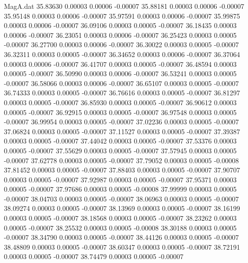 \begin{filecontents}{MagA.dat}
  35.83630    0.00003    0.00006   -0.00007
  35.88181    0.00003    0.00006   -0.00007
  35.95148    0.00003    0.00006   -0.00007
  35.97591    0.00003    0.00006   -0.00007
  35.99875    0.00003    0.00006   -0.00007
  36.09106    0.00003    0.00005   -0.00007
  36.18435    0.00003    0.00006   -0.00007
  36.23051    0.00003    0.00006   -0.00007
  36.25423    0.00003    0.00005   -0.00007
  36.27700    0.00003    0.00006   -0.00007
  36.30022    0.00003    0.00005   -0.00007
  36.32311    0.00003    0.00005   -0.00007
  36.34652    0.00003    0.00006   -0.00007
  36.37064    0.00003    0.00006   -0.00007
  36.41707    0.00003    0.00005   -0.00007
  36.48594    0.00003    0.00005   -0.00007
  36.50990    0.00003    0.00006   -0.00007
  36.53241    0.00003    0.00005   -0.00007
  36.58066    0.00003    0.00006   -0.00007
  36.65107    0.00003    0.00005   -0.00007
  36.74333    0.00003    0.00005   -0.00007
  36.76616    0.00003    0.00005   -0.00007
  36.81297    0.00003    0.00005   -0.00007
  36.85930    0.00003    0.00005   -0.00007
  36.90612    0.00003    0.00005   -0.00007
  36.92915    0.00003    0.00005   -0.00007
  36.97548    0.00003    0.00005   -0.00007
  36.99954    0.00003    0.00005   -0.00007
  37.02236    0.00003    0.00005   -0.00007
  37.06824    0.00003    0.00005   -0.00007
  37.11527    0.00003    0.00005   -0.00007
  37.39387    0.00003    0.00005   -0.00007
  37.44042    0.00003    0.00005   -0.00007
  37.53376    0.00003    0.00005   -0.00007
  37.55629    0.00003    0.00005   -0.00007
  37.57945    0.00003    0.00005   -0.00007
  37.62778    0.00003    0.00005   -0.00007
  37.79052    0.00003    0.00005   -0.00008
  37.81452    0.00003    0.00005   -0.00007
  37.88403    0.00003    0.00005   -0.00007
  37.90707    0.00003    0.00005   -0.00007
  37.92987    0.00003    0.00005   -0.00007
  37.95371    0.00003    0.00005   -0.00007
  37.97686    0.00003    0.00005   -0.00008
  37.99999    0.00003    0.00005   -0.00007
  38.04703    0.00003    0.00005   -0.00007
  38.06963    0.00003    0.00005   -0.00007
  38.09274    0.00003    0.00005   -0.00007
  38.13969    0.00003    0.00005   -0.00007
  38.16199    0.00003    0.00005   -0.00007
  38.18568    0.00003    0.00005   -0.00007
  38.23262    0.00003    0.00005   -0.00007
  38.25532    0.00003    0.00005   -0.00008
  38.30188    0.00003    0.00005   -0.00007
  38.34790    0.00003    0.00005   -0.00007
  38.44126    0.00003    0.00005   -0.00007
  38.48809    0.00003    0.00005   -0.00007
  38.60347    0.00003    0.00005   -0.00007
  38.72191    0.00003    0.00005   -0.00007
  38.74479    0.00003    0.00005   -0.00007

\end{filecontents}
